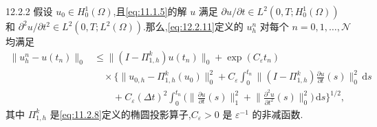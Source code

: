 \begin{theorem}[]{12.2.2}
假设 \(u_0\in H_0^1(\Omega)\),且\eqref{eq:11.1.5}的解 \(u\) 满足 \(\partial u/\partial t\in L^2(0,T;H_0^1(\Omega))\) 和 \(\partial^2u/\partial t^2\in L^2(0,T;L^2(\Omega))\).那么,\eqref{eq:12.2.11}定义的 \(u_h^n\) 对每个 \(n=0,1,\ldots,\mathcal N\) 均满足
\begin{equation}\label{eq:12.2.13}
  \begin{aligned}
    \|u_h^n-u(t_n)\|_0
      &\le\|(I-\Pi_{1,h}^k)u(t_n)\|_0+\exp(C_\varepsilon t_n)\\
      &\quad\times\biggl\{\|u_{0,h}-\Pi_{1,h}^k(u_0)\|_0^2
        +C_\varepsilon\int_0^{t_n}\biggl\|(I-\Pi_{1,h}^k)
          \frac{\partial u}{\partial t}(s)\biggr\|_0^2\,\mathrm ds\\
      &\qquad+C_\varepsilon(\Delta t)^2\int_0^{t_n}
        \biggl(\biggl\|\frac{\partial u}{\partial t}(s)\biggr\|_1^2
          +\biggl\|\frac{\partial^2u}{\partial t^2}(s)\biggr\|_0^2\biggr)\,\mathrm ds
        \biggr\}^{1/2},
  \end{aligned}
\end{equation}
其中 \(\Pi_{1,h}^k\) 是\eqref{eq:11.2.8}定义的椭圆投影算子,\(C_\varepsilon>0\) 是 \(\varepsilon^{-1}\) 的非减函数.
\end{theorem}

